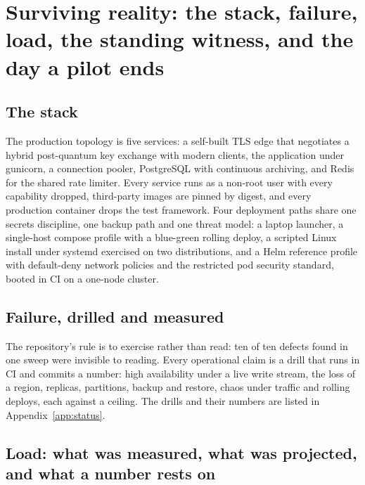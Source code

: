 \section{Surviving reality: the stack, failure, load, the standing witness, and the day a pilot ends}
\label{sec:operations}



\subsection{The stack}

The production topology is five services: a self-built TLS edge that negotiates a hybrid
post-quantum key exchange with modern clients, the application under gunicorn, a connection pooler,
PostgreSQL with continuous archiving, and Redis for the shared rate limiter. Every service runs as a
non-root user with every capability dropped, third-party images are pinned by digest, and every
production container drops the test framework. Four deployment paths share one secrets discipline,
one backup path and one threat model: a laptop launcher, a single-host compose profile with a
blue-green rolling deploy, a scripted Linux install under systemd exercised on two distributions,
and a Helm reference profile with default-deny network policies and the restricted pod security
standard, booted in CI on a one-node cluster. \sImpl

\subsection{Failure, drilled and measured}

The repository's rule is to exercise rather than read: ten of ten defects found in one sweep were
invisible to reading. Every operational claim is a drill that runs in CI and commits a number: high availability under
a live write stream, the loss of a region, replicas, partitions, backup and restore, chaos under
traffic and rolling deploys, each against a ceiling. The drills and their numbers are listed in
Appendix~\ref{app:status}.


\subsection{Load: what was measured, what was projected, and what a number rests on}

